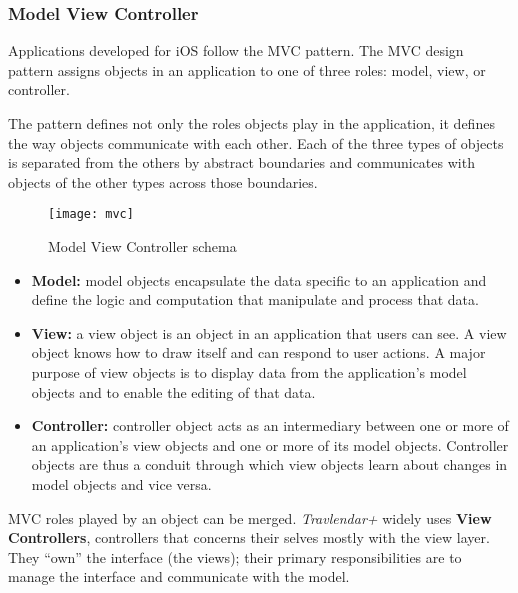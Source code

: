 \subsubsection{Model View Controller}
Applications developed for iOS follow the MVC pattern.
The MVC design pattern assigns objects in an application to one of three roles: model, view, or controller. 

The pattern defines not only the roles objects play in the application, it defines the way objects communicate with each other. Each of the three types of objects is separated from the others by abstract boundaries and communicates with objects of the other types across those boundaries.

\begin{figure}[H]
	\centering
	\texttt{[image: mvc]}
	\caption{Model View Controller schema}
\end{figure}

\begin{itemize}
	\item \textbf{Model:} model objects encapsulate the data specific to an application and define the logic and computation that manipulate and process that data.
	\item \textbf{View:} a view object is an object in an application that users can see. A view object knows how to draw itself and can respond to user actions. A major purpose of view objects is to display data from the application’s model objects and to enable the editing of that data.
	\item \textbf{Controller:}  controller object acts as an intermediary between one or more of an application’s view objects and one or more of its model objects. Controller objects are thus a conduit through which view objects learn about changes in model objects and vice versa.
\end{itemize}

\noindent
MVC roles played by an object can be merged. \textit{Travlendar+} widely uses \textbf{View Controllers}, controllers that concerns their selves mostly with the view layer. They “own” the interface (the views); their primary responsibilities are to manage the interface and communicate with the model.

